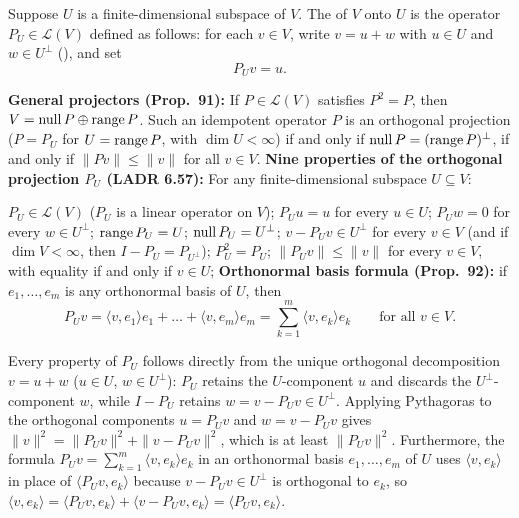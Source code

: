 \documentclass[10pt]{scrartcl}
\newcommand{\ip}[2]{\langle #1,#2\rangle}
\newcommand{\LL}{\mathcal L}\newcommand{\PP}{\mathcal P}\newcommand{\MM}{\mathcal M}
\begin{document}
\begin{definition*}
  Suppose $U$ is a finite-dimensional subspace of $V$. The  of $V$ onto $U$ is the operator $P_U\in\LL(V)$ defined as follows: for each $v\in V$, write $v=u+w$ with $u\in U$ and $w\in U^\perp$ (), and set
  \[
    P_U v = u.
  \]
\end{definition*}

\begin{proposition*}
  \begin{enumerate}[(A)]
    \ii \textbf{General projectors (Prop.~91):} If $P\in\LL(V)$ satisfies $P^2=P$, then $V=\operatorname{null} P\oplus\operatorname{range} P$. Such an idempotent operator $P$ is an orthogonal projection ($P=P_U$ for $U=\operatorname{range} P$, with $\dim U<\infty$) if and only if $\operatorname{null} P=(\operatorname{range} P)^\perp$, if and only if $\|Pv\|\le\|v\|$ for all $v\in V$.
    \ii \textbf{Nine properties of the orthogonal projection $P_U$ (LADR 6.57):} For any finite-dimensional subspace $U\subseteq V$:
    \begin{enumerate}[(a)]
      \ii $P_U\in\LL(V)$ ($P_U$ is a linear operator on $V$);
      \ii $P_U u = u$ for every $u\in U$;
      \ii $P_U w = 0$ for every $w\in U^\perp$;
      \ii $\operatorname{range} P_U = U$;
      \ii $\operatorname{null} P_U = U^\perp$;
      \ii $v - P_U v \in U^\perp$ for every $v\in V$ (and if $\dim V<\infty$, then $I-P_U=P_{U^\perp}$);
      \ii $P_U^2 = P_U$;
      \ii $\|P_U v\| \le \|v\|$ for every $v\in V$, with equality if and only if $v\in U$;
      \ii \textbf{Orthonormal basis formula (Prop.~92):} if $e_1,\dots,e_m$ is any orthonormal basis of $U$, then
      \[
        P_U v = \ip v{e_1}e_1 + \dots + \ip v{e_m}e_m = \sum_{k=1}^m \ip v{e_k}e_k \qquad\text{for all }v\in V.
      \]
    \end{enumerate}
  \end{enumerate}
\end{proposition*}
\begin{ideabox}
  Every property of $P_U$ follows directly from the unique orthogonal decomposition $v=u+w$ ($u\in U$, $w\in U^\perp$): $P_U$ retains the $U$-component $u$ and discards the $U^\perp$-component $w$, while $I-P_U$ retains $w=v-P_U v\in U^\perp$. Applying Pythagoras to the orthogonal components $u=P_U v$ and $w=v-P_U v$ gives $\|v\|^2=\|P_U v\|^2+\|v-P_U v\|^2$, which is at least $\|P_Uv\|^2$. Furthermore, the formula $P_U v=\sum_{k=1}^m\ip v{e_k}e_k$ in an orthonormal basis $e_1,\dots,e_m$ of $U$ uses $\ip v{e_k}$ in place of $\ip{P_U v}{e_k}$ because $v-P_U v\in U^\perp$ is orthogonal to $e_k$, so $\ip v{e_k}=\ip{P_U v}{e_k}+\ip{v-P_U v}{e_k}=\ip{P_U v}{e_k}$.
\end{ideabox}
\end{document}
